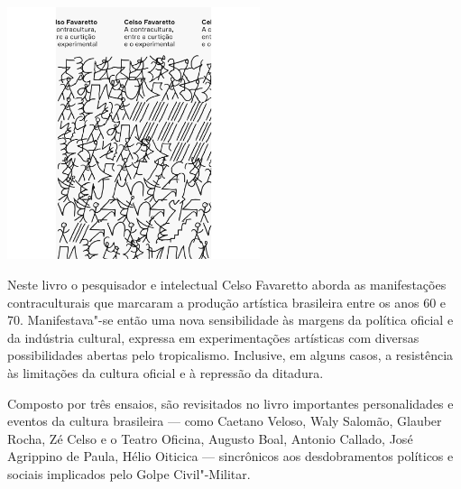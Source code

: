 \pagebreak %


\begin{center}

\hspace*{.5cm}\includegraphics[width=74mm]{./grid/favaretto.png}
\end{center}

\hspace*{-7cm}\hrulefill\hspace*{-7cm}

\medskip

\noindent{}Neste livro o pesquisador e intelectual Celso Favaretto aborda as manifestações contraculturais que marcaram a produção artística brasileira entre os anos 60 e 70. Manifestava"-se então uma nova sensibilidade às margens da política oficial e da indústria cultural, expressa em experimentações artísticas com diversas possibilidades abertas pelo tropicalismo.  Inclusive, em alguns casos, a resistência às limitações da cultura oficial e à repressão da ditadura.

Composto por três ensaios, são revisitados no livro importantes personalidades e eventos da cultura brasileira --- como Caetano Veloso, Waly Salomão, Glauber Rocha, Zé Celso e o Teatro Oficina, Augusto Boal, Antonio Callado, José Agrippino de Paula, Hélio Oiticica --- sincrônicos aos desdobramentos políticos e sociais implicados pelo Golpe Civil"-Militar.

\vfill

\hspace*{-.4cm}\begin{minipage}[c]{1\linewidth}
\small{
{}}
\end{minipage}

